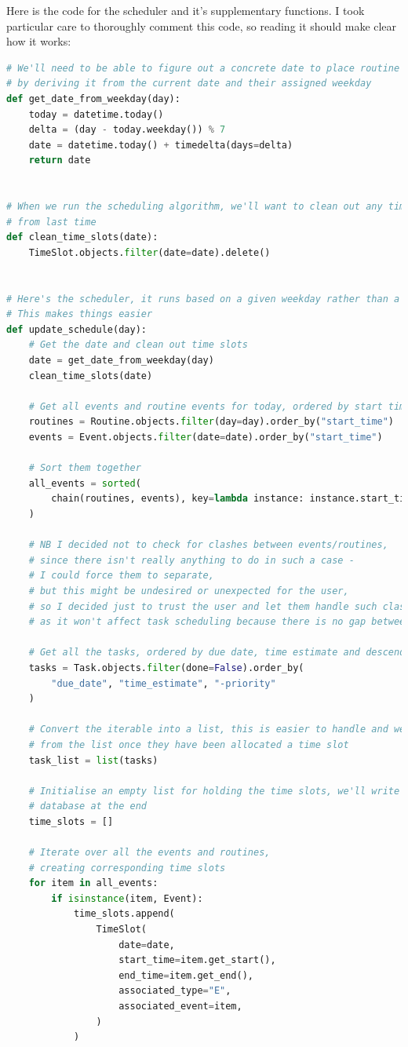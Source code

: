 \documentclass{article}
\begin{document}
Here is the code for the scheduler and it's supplementary functions.
I took particular care to thoroughly comment this code,
so reading it should make clear how it works:
\begin{lstlisting}[language=Python]
# We'll need to be able to figure out a concrete date to place routine events on
# by deriving it from the current date and their assigned weekday
def get_date_from_weekday(day):
    today = datetime.today()
    delta = (day - today.weekday()) % 7
    date = datetime.today() + timedelta(days=delta)
    return date


# When we run the scheduling algorithm, we'll want to clean out any time slots
# from last time
def clean_time_slots(date):
    TimeSlot.objects.filter(date=date).delete()


# Here's the scheduler, it runs based on a given weekday rather than a date.
# This makes things easier
def update_schedule(day):
    # Get the date and clean out time slots
    date = get_date_from_weekday(day)
    clean_time_slots(date)

    # Get all events and routine events for today, ordered by start time
    routines = Routine.objects.filter(day=day).order_by("start_time")
    events = Event.objects.filter(date=date).order_by("start_time")

    # Sort them together
    all_events = sorted(
        chain(routines, events), key=lambda instance: instance.start_time
    )

    # NB I decided not to check for clashes between events/routines,
    # since there isn't really anything to do in such a case -
    # I could force them to separate,
    # but this might be undesired or unexpected for the user,
    # so I decided just to trust the user and let them handle such clashed,
    # as it won't affect task scheduling because there is no gap between them.

    # Get all the tasks, ordered by due date, time estimate and descending priority level
    tasks = Task.objects.filter(done=False).order_by(
        "due_date", "time_estimate", "-priority"
    )

    # Convert the iterable into a list, this is easier to handle and we can remove tasks
    # from the list once they have been allocated a time slot
    task_list = list(tasks)

    # Initialise an empty list for holding the time slots, we'll write them all to the
    # database at the end
    time_slots = []

    # Iterate over all the events and routines,
    # creating corresponding time slots
    for item in all_events:
        if isinstance(item, Event):
            time_slots.append(
                TimeSlot(
                    date=date,
                    start_time=item.get_start(),
                    end_time=item.get_end(),
                    associated_type="E",
                    associated_event=item,
                )
            )


\end{lstlisting}
\end{document}
